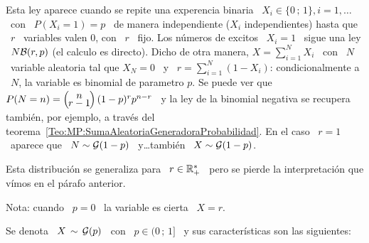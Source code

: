 Esta ley aparece cuando se repite una experencia binaria \ $X_i \in \{ 0 \, ; \,
1 \},  i = 1, \ldots$  \ con \ $P(X_i=1)  = p$ \ de  manera independiente ($X_i$
independientes) hasta  que \  $r$ \  variables valen 0,  con \  $r$ \  fijo. Los
n\'umeros de  excitos \ $X_i =  1$ \ sigue una  ley \ $N\mathcal{B}(r,p)$  (el calculo es
directo).  Dicho de otra  manera, $X = \sum_{i=1}^N X_i$ \ con  \ $N$ \ variable
aleatoria tal que $X_N = 0$ \ y \ $r = \sum_{i=1}^N (1-X_i)$: condicionalmente a
\ $N$, la variable es binomial de parametro $p$.  Se puede ver que \ $P(N = n) =
\bino{n}{r-1} (1-p)^r  p^{n-r}$ \ y la  ley de la binomial  negativa se recupera
tambi\'en,          por         ejemplo,         a          trav\'es         del
teorema~\ref{Teo:MP:SumaAleatoriaGeneradoraProbabilidad}. En el caso \ $r = 1$ \
aparece que \ $N \sim \mathcal{G}(1-p)$ \ y\ldots tambi\'en \ $X \sim \mathcal{G}(1-p)$.
%

Esta distribuci\'on se  generaliza para \ $r \in \mathbb{R}_+^*$ \  pero se pierde la
interpretaci\'on que v\'imos en el p\'arafo anterior.

Nota: cuando \ $p = 0$ \ la variable es cierta \ $X = r$.



\label{Sssec:MP:Geometrica}

Se  denota \  $X \,  \sim \,  \mathcal{G}(p)$ \  con \  $p \in  (0 \,  ; \,  1]$ \  y sus
caracter\'isticas son las siguientes:

